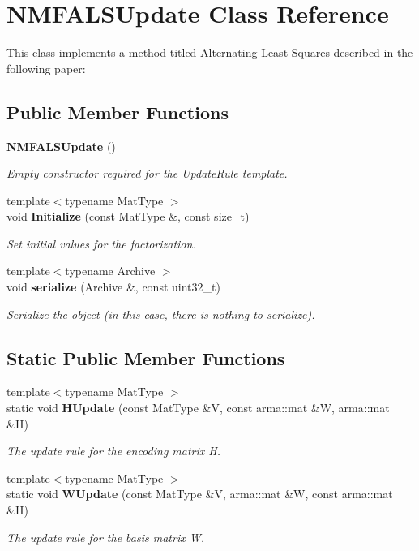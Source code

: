 \section{N\+M\+F\+A\+L\+S\+Update Class Reference}
\label{classmlpack_1_1amf_1_1NMFALSUpdate}


This class implements a method titled \textquotesingle{}Alternating Least Squares\textquotesingle{} described in the following paper\+:  


\subsection*{Public Member Functions}
\begin{DoxyCompactItemize}
\item 
\textbf{ N\+M\+F\+A\+L\+S\+Update} ()
\begin{DoxyCompactList}\small\item\em Empty constructor required for the Update\+Rule template. \end{DoxyCompactList}\item 
{\footnotesize template$<$typename Mat\+Type $>$ }\\void \textbf{ Initialize} (const Mat\+Type \&, const size\+\_\+t)
\begin{DoxyCompactList}\small\item\em Set initial values for the factorization. \end{DoxyCompactList}\item 
{\footnotesize template$<$typename Archive $>$ }\\void \textbf{ serialize} (Archive \&, const uint32\+\_\+t)
\begin{DoxyCompactList}\small\item\em Serialize the object (in this case, there is nothing to serialize). \end{DoxyCompactList}\end{DoxyCompactItemize}
\subsection*{Static Public Member Functions}
\begin{DoxyCompactItemize}
\item 
{\footnotesize template$<$typename Mat\+Type $>$ }\\static void \textbf{ H\+Update} (const Mat\+Type \&V, const arma\+::mat \&W, arma\+::mat \&H)
\begin{DoxyCompactList}\small\item\em The update rule for the encoding matrix H. \end{DoxyCompactList}\item 
{\footnotesize template$<$typename Mat\+Type $>$ }\\static void \textbf{ W\+Update} (const Mat\+Type \&V, arma\+::mat \&W, const arma\+::mat \&H)
\begin{DoxyCompactList}\small\item\em The update rule for the basis matrix W. \end{DoxyCompactList}\end{DoxyCompactItemize}


